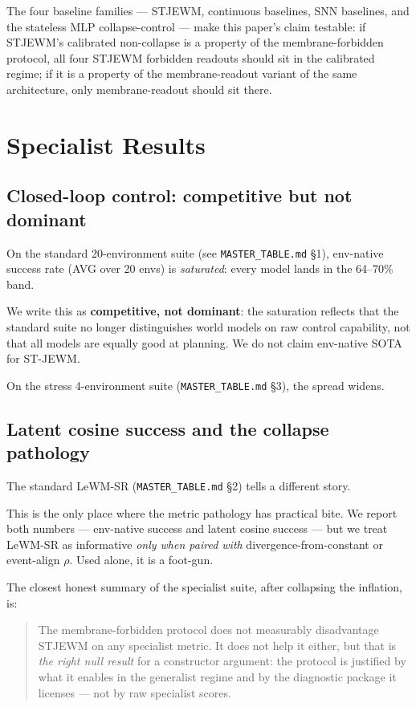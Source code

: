 \documentclass{article}
\begin{document}
The four baseline families --- STJEWM, continuous baselines, SNN baselines, and the stateless MLP collapse-control --- make this paper's claim testable: if STJEWM's calibrated non-collapse is a property of the membrane-forbidden protocol, all four STJEWM forbidden readouts should sit in the calibrated regime; if it is a property of the membrane-readout variant of the same architecture, only membrane-readout should sit there.

\section{Specialist Results}

\subsection{Closed-loop control: competitive but not dominant}

On the standard 20-environment suite (see \texttt{MASTER\_TABLE.md} §1), env-native success rate (AVG over 20 envs) is \emph{saturated}: every model lands in the 64--70\% band.

We write this as \textbf{competitive, not dominant}: the saturation reflects that the standard suite no longer distinguishes world models on raw control capability, not that all models are equally good at planning. We do not claim env-native SOTA for ST-JEWM.

On the stress 4-environment suite (\texttt{MASTER\_TABLE.md} §3), the spread widens.

\subsection{Latent cosine success and the collapse pathology}

The standard LeWM-SR (\texttt{MASTER\_TABLE.md} §2) tells a different story.

This is the only place where the metric pathology has practical bite. We report both numbers --- env-native success and latent cosine success --- but we treat LeWM-SR as informative \emph{only when paired with} divergence-from-constant or event-align $\rho$. Used alone, it is a foot-gun.

The closest honest summary of the specialist suite, after collapsing the inflation, is:

\begin{quote}
The membrane-forbidden protocol does not measurably disadvantage STJEWM on any specialist metric. It does not help it either, but that is \emph{the right null result} for a constructor argument: the protocol is justified by what it enables in the generalist regime and by the diagnostic package it licenses --- not by raw specialist scores.
\end{quote}
\end{document}
